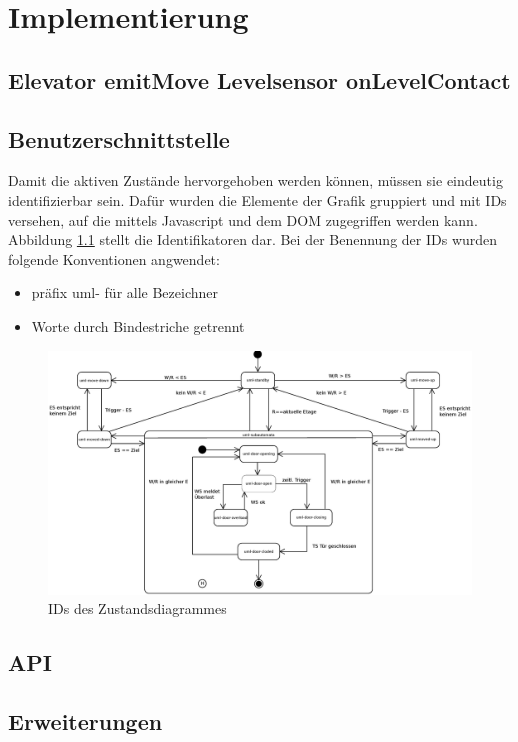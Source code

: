 \chapter{Implementierung}
\label{imp}

\section{Elevator emitMove Levelsensor onLevelContact}
\label{onLevelContact}

\section{Benutzerschnittstelle}
Damit die aktiven Zustände hervorgehoben werden können, müssen sie eindeutig identifizierbar sein. Dafür wurden die Elemente der Grafik gruppiert und mit IDs versehen, auf die mittels Javascript und dem \acrshort{DOM} zugegriffen werden kann. Abbildung \ref{fig:ZD_id_view} stellt die Identifikatoren dar. Bei der Benennung der IDs wurden folgende Konventionen angwendet:
\begin{itemize}
	\item präfix uml- für alle Bezeichner
	\item Worte durch Bindestriche getrennt
\end{itemize}

\begin{figure}[hbt]
	\centering
	\includegraphics[width=\textwidth]{images/ZDv6_id_view.eps}
	\caption{IDs des Zustandsdiagrammes}%
	\label{fig:ZD_id_view}%
\end{figure}

\section{API}

\section{Erweiterungen}

